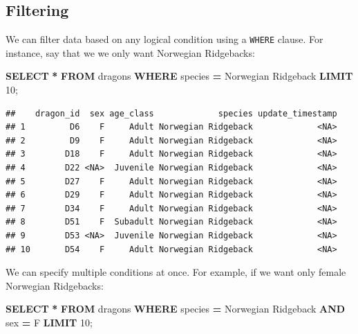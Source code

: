 \documentclass[
]{book}
\newenvironment{Shaded}{\begin{snugshade}}{\end{snugshade}}
\newcommand{\DecValTok}[1]{\textcolor[rgb]{0.00,0.00,0.81}{#1}}
\newcommand{\KeywordTok}[1]{\textcolor[rgb]{0.13,0.29,0.53}{\textbf{#1}}}
\newcommand{\NormalTok}[1]{#1}
\newcommand{\OperatorTok}[1]{\textcolor[rgb]{0.81,0.36,0.00}{\textbf{#1}}}
\newcommand{\StringTok}[1]{\textcolor[rgb]{0.31,0.60,0.02}{#1}}
\begin{document}
\hypertarget{filtering}{%
\subsection{Filtering}\label{filtering}}

We can filter data based on any logical condition using a \texttt{WHERE} clause. For
instance, say that we we only want Norwegian Ridgebacks:

\begin{Shaded}
\begin{Highlighting}[]
\KeywordTok{SELECT} \OperatorTok{*} 
\KeywordTok{FROM}\NormalTok{ dragons}
\KeywordTok{WHERE}\NormalTok{ species }\OperatorTok{=} \StringTok{\textquotesingle{}Norwegian Ridgeback\textquotesingle{}}
\KeywordTok{LIMIT} \DecValTok{10}\NormalTok{;}
\end{Highlighting}
\end{Shaded}

\begin{verbatim}
##    dragon_id  sex age_class             species update_timestamp
## 1         D6    F     Adult Norwegian Ridgeback             <NA>
## 2         D9    F     Adult Norwegian Ridgeback             <NA>
## 3        D18    F     Adult Norwegian Ridgeback             <NA>
## 4        D22 <NA>  Juvenile Norwegian Ridgeback             <NA>
## 5        D27    F     Adult Norwegian Ridgeback             <NA>
## 6        D29    F     Adult Norwegian Ridgeback             <NA>
## 7        D34    F     Adult Norwegian Ridgeback             <NA>
## 8        D51    F  Subadult Norwegian Ridgeback             <NA>
## 9        D53 <NA>  Juvenile Norwegian Ridgeback             <NA>
## 10       D54    F     Adult Norwegian Ridgeback             <NA>
\end{verbatim}

We can specify multiple conditions at once. For example, if we want only female
Norwegian Ridgebacks:

\begin{Shaded}
\begin{Highlighting}[]
\KeywordTok{SELECT} \OperatorTok{*} 
\KeywordTok{FROM}\NormalTok{ dragons}
\KeywordTok{WHERE}\NormalTok{ species }\OperatorTok{=} \StringTok{\textquotesingle{}Norwegian Ridgeback\textquotesingle{}} \KeywordTok{AND}\NormalTok{ sex }\OperatorTok{=} \StringTok{\textquotesingle{}F\textquotesingle{}}
\KeywordTok{LIMIT} \DecValTok{10}\NormalTok{;}
\end{Highlighting}
\end{Shaded}
\end{document}
